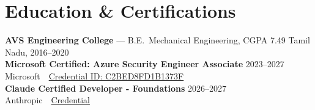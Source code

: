 \documentclass[9pt, letterpaper]{extarticle}
\begin{document}
\section{Education \& Certifications}
\textbf{AVS Engineering College} --- B.E.\ Mechanical Engineering, CGPA 7.49 \hfill \textcolor{subtle}{\small Tamil Nadu, 2016--2020} \\[4pt]
\textbf{Microsoft Certified: Azure Security Engineer Associate} \hfill \textcolor{subtle}{\small 2023--2027} \\
{\small Microsoft\ \textbar\ \href{https://learn.microsoft.com/api/credentials/share/en-us/MohammedYusuf-0636/C2BED8FD1B1373F?sharingId=DBB00A15C7365DA5}{Credential ID: C2BED8FD1B1373F}} \\
\textbf{Claude Certified Developer - Foundations} \hfill \textcolor{subtle}{\small 2026--2027} \\
{\small Anthropic\ \textbar\ \href{https://www.credly.com/badges/fa2fa770-8043-47b8-915e-51c7a1e578c2/linked_in_profile}{Credential}}
\end{document}
